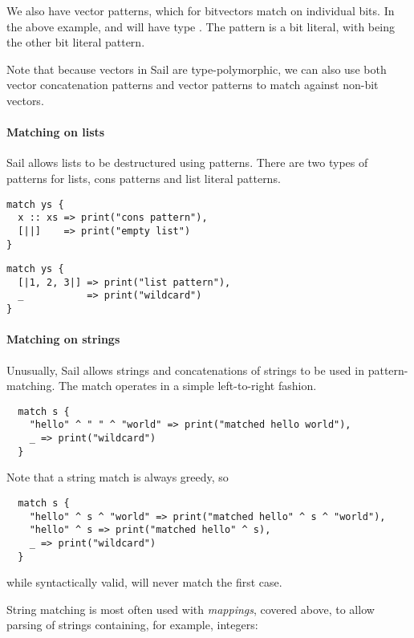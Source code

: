We also have vector patterns, which for bitvectors match on individual
bits. In the above example,  and  will have type
. The pattern  is a bit literal, with 
being the other bit literal pattern.

Note that because vectors in Sail are type-polymorphic, we can also
use both vector concatenation patterns and vector patterns to match
against non-bit vectors.

\paragraph{Matching on lists}

Sail allows lists to be destructured using patterns. There are two
types of patterns for lists, cons patterns and list literal patterns.

\begin{lstlisting}
match ys {
  x :: xs => print("cons pattern"),
  [||]    => print("empty list")
}
\end{lstlisting}

\begin{lstlisting}
match ys {
  [|1, 2, 3|] => print("list pattern"),
  _           => print("wildcard")
}
\end{lstlisting}

\paragraph{Matching on strings}

Unusually, Sail allows strings and concatenations of strings to be
used in pattern-matching. The match operates in a simple left-to-right
fashion.

\begin{lstlisting}
  match s {
    "hello" ^ " " ^ "world" => print("matched hello world"),
    _ => print("wildcard")
  }
\end{lstlisting}

Note that a string match is always greedy, so

\begin{lstlisting}
  match s {
    "hello" ^ s ^ "world" => print("matched hello" ^ s ^ "world"),
    "hello" ^ s => print("matched hello" ^ s),
    _ => print("wildcard")
  }
\end{lstlisting}

while syntactically valid, will never match the first case.

String matching is most often used with \emph{mappings}, covered
above, to allow parsing of strings containing, for example, integers:

